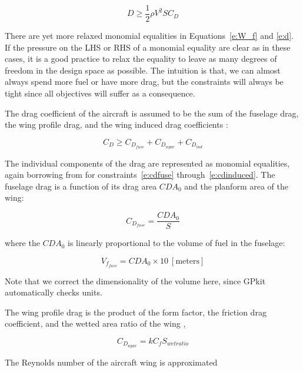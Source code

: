 \begin{equation}
    D \geq \frac{1}{2} \rho V^2 S C_D
    \label{e:d}
\end{equation}

There are yet more relaxed monomial equalities in Equations~\ref{e:W_f} and \ref{e:d}.
If the pressure on the \gls{LHS} or \gls{RHS} of a monomial equality are clear as in these cases,
it is a good practice to relax the equality to leave as many degrees of freedom
in the design space as possible. The intuition is that, we can almost always spend more fuel or have more drag,
but the constraints will always be tight since all objectives will suffer as a consequence.

The drag coefficient of the aircraft is assumed to be the sum of the fuselage drag,
the wing profile drag, and the wing induced drag coefficients \cite{gp_ac_design}:

\begin{equation}
    C_D \geq C_{D_{fuse}} + C_{D_{wpar}} + C_{D_{ind}}
\label{e:cd}
\end{equation}

The individual components of the drag are represented as monomial equalities, again borrowing
from \cite{gp_ac_design} for constraints~\ref{e:cdfuse} through~\ref{e:cdinduced}.
The fuselage drag is a function of its drag area $CDA_0$ and the planform area of the wing:

\begin{equation}
    C_{D_{fuse}} = \frac{CDA_0}{S}
\label{e:cdfuse}
\end{equation}

where the $CDA_0$ is linearly proportional to the volume of fuel in the fuselage:

\begin{equation}
    V_{f_{fuse}} = CDA_0 \times 10 ~\mathrm{[meters]}
\label{e:vffuse}
\end{equation}

Note that we correct the dimensionality of the volume here, since GPkit automatically checks units.

The wing profile drag is the product of the form factor, the friction drag coefficient,
and the wetted area ratio of the wing \cite{gp_ac_design},

\begin{equation}
    C_{D_{wpar}} = k C_f S_{wetratio}
\label{e:cdwpar}
\end{equation}

The Reynolds number of the aircraft wing is approximated

